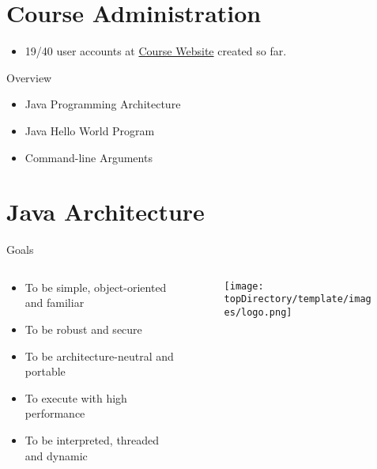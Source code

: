 \documentclass[10pt, compress]{beamer}
\begin{document}
\prepareCover

\section{Course Administration}

\begin{slide}
	\begin{itemize}
		\item[] 19/40 user accounts at \href{http://www.ghorbanzade.com}{Course Website} created so far.
	\end{itemize}
\end{slide}

\begin{slide}
	\begin{block}{Overview}
		\begin{itemize}
			\item[] Java Programming Architecture
			\item[] Java Hello World Program
			\item[] Command-line Arguments
		\end{itemize}
	\end{block}
\end{slide}

\section{Java Architecture}

\begin{slide}
	\begin{block}{Goals}
		\begin{columns}
			\begin{column}{0.7\textwidth}
			\begin{itemize}
				\item[] To be simple, object-oriented and familiar
				\item[] To be robust and secure
				\item[] To be architecture-neutral and portable
				\item[] To execute with high performance
				\item[] To be interpreted, threaded and dynamic
			\end{itemize}
			\end{column}
			\begin{column}{0.3\textwidth}
			\begin{figure}
				\texttt{[image: \\topDirectory/template/images/logo.png]}
			\end{figure}
			\end{column}
		\end{columns}
	\end{block}
\end{slide}
\end{document}
